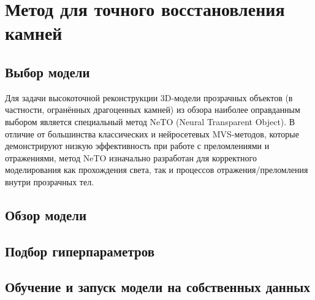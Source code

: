 \chapter{Метод для точного восстановления камней}

\section{Выбор модели}

Для задачи высокоточной реконструкции 3D‑модели прозрачных объектов (в
частности, огранённых драгоценных камней) из обзора наиболее оправданным выбором
является специальный метод NeTO (Neural Transparent Object). В отличие от
большинства классических и нейросетевых MVS-методов, которые демонстрируют
низкую эффективность при работе с преломлениями и отражениями, метод NeTO
изначально разработан для корректного моделирования как прохождения света, так и
процессов отражения/преломления внутри прозрачных тел.

\section{Обзор модели}
\section{Подбор гиперпараметров}
\section{Обучение и запуск модели на собственных данных}
